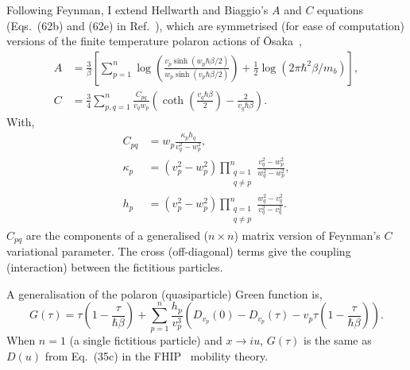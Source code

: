 Following Feynman, I extend Hellwarth and Biaggio's $A$ and $C$ equations (Eqs.~(62b) and (62e) in Ref.~\cite{hellwarth_mobility_1999}), which are symmetrised (for ease of computation) versions of the finite temperature polaron actions of \=Osaka~\cite{osaka_polaron_1959}, 
\begin{subequations}
\begin{align}
    A &= \frac{3}{\beta} \left[ \sum_{p = 1}^n \log\left(\frac{v_{p} \sinh (w_{p} \hbar \beta / 2)}{w_{p} \sinh (v_{p} \hbar \beta / 2)}\right) + \frac{1}{2} \log \left(2\pi\hbar^2 \beta / m_b\right) \right] , \label{eqn:A} \\
    C &= \frac{3}{4} \sum_{p, q = 1}^n \frac{C_{pq}}{v_{q} w_{p}} \left( \coth \left( \frac{v_{q} \hbar \beta}{2} \right) - \frac{2}{v_{q} \hbar \beta} \right) . \label{eqn:C}
\end{align}
\end{subequations}
With, 
\begin{subequations}
    \begin{align}
        C_{pq} &= w_{p} \frac{\kappa_{p} h_{q}}{v_{q}^2 - w_{p}^2} ,\\
        \kappa_{p} &= \left(v_{p}^2 - w_{p}^2 \right) \prod\limits_{\substack{q=1 \\ q\neq p}}^n \frac{v_{q}^2 - w_{p}^2}{w_{q}^2 - w_{p}^2} ,\\
        h_{p} &= \left( v_{p}^2 - w_{p}^2 \right) \prod\limits_{\substack{q=1 \\ q\neq p}}^n \frac{w_{q}^2 - v_{q}^2}{v_{q}^2 - v_{q}^2} .
    \end{align}
\end{subequations}
$C_{pq}$ are the components of a generalised ($n \times n$) matrix version of Feynman's $C$ variational parameter. The cross (off-diagonal) terms give the coupling (interaction) between the fictitious particles.

A generalisation of the polaron (quasiparticle) Green function is,
\begin{equation}\label{eqn:multi_D}
    G(\tau) = \tau  \left(1 - \frac{\tau}{\hbar\beta}\right) + \sum_{p=1}^n \frac{h_p}{v_p^3} \left(D_{v_p}(0) - D_{v_p}(\tau) - v_p \tau \left(1 - \frac{\tau}{\hbar\beta} \right)\right).
\end{equation}
When $n=1$ (a single fictitious particle) and $x \rightarrow iu$, $G(\tau)$ is the same as $D(u)$ from Eq.~(35c) in the FHIP~\cite{feynman_mobility_1962} mobility theory. 

